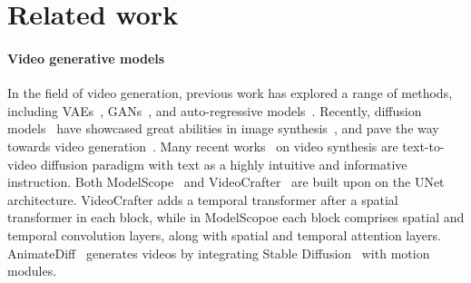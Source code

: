 \section{Related work}
\label{sec:realted}
\paragraph{Video generative models}
In the field of video generation, previous work has explored a range of methods, including VAEs~\citep{diederik2014vae,Hsieh2018DDPAE,sarthak2020guassianVae}, 
GANs~\citep{goodfellow2014gan,tian2021mocogan-hd,brooks2022dynamicSenes,Skorokhodov2022stylegan-v}, and auto-regressive models~\citep{wu2021godiva,chenfei2022nuwa,Songwei2022longvideo,wenyi2023cogvideo}. 
Recently, diffusion models~\citep{ho2020denoising,song2021scorebased,jascha2015nonequilibrium,dhariwal2021diffusionBeatsGan} have showcased great abilities in image synthesis~\citep{Rombach2022SD,Saharia2022imagen,Alexander2022glide}, and pave the way towards video generation~\citep{ho2022vdmodels,he2022latentVD,voleti2022mcvd}.
Many recent works~\citep{ho2022imagenvideo,Blattmann2023align,ge2023PYoCo,guo2023animatediff,wang2023modelscope,chen2023videocrafter1} on video synthesis are text-to-video diffusion paradigm with text as a highly intuitive and informative instruction.
Both ModelScope~\citep{wang2023modelscope,VideoFusion} and VideoCrafter~\citep{chen2023videocrafter1} are built upon on the UNet~\citep{Olaf2015unet} architecture.
VideoCrafter adds a temporal transformer after a spatial transformer in each block, while in ModelScopoe each block comprises spatial and temporal convolution layers, along with spatial and temporal attention layers.
AnimateDiff~\citep{guo2023animatediff} generates videos by integrating Stable Diffusion~\citep{Rombach2022SD} with motion modules. 

